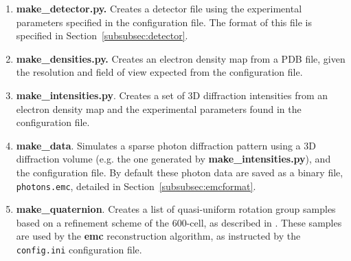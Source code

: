 \documentclass[]{iucr}              %
\begin{document}
\begin{enumerate}
\item{\bf make\_detector.py.} Creates a detector file using the experimental parameters specified in the configuration file. The format of this file is specified in Section~\ref{subsubsec:detector}.
\item{\bf make\_densities.py.} Creates an electron density map from a PDB file, given the resolution and field of view expected from the configuration file.
\item{\bf make\_intensities.py}. Creates a set of 3D diffraction intensities from an electron density map and the experimental parameters found in the configuration file.  
\item{\bf make\_data}. Simulates a sparse photon diffraction pattern using a 3D diffraction volume (e.g. the one generated by {\bf make\_intensities.py}), and the configuration file. By default these photon data are saved as a binary file, \texttt{photons.emc}, detailed in Section~\ref{subsubsec:emcformat}.
\item{\bf make\_quaternion}. Creates a list of quasi-uniform rotation group samples based on a refinement scheme of the 600-cell, as described in . These samples are used by the {\bf emc} reconstruction algorithm, as instructed by the \texttt{config.ini} configuration file.
\end{enumerate}
\end{document}
